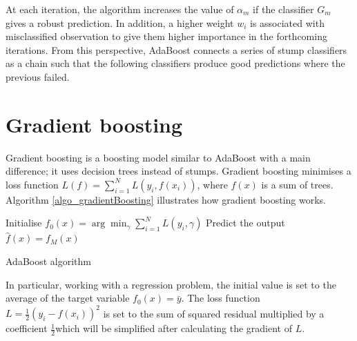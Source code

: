At each iteration, the algorithm increases the value of $\alpha_m$ if the classifier $G_m$ gives a robust prediction. In addition, a higher weight $w_i$ is associated with misclassified observation to give them higher importance in the forthcoming iterations. From this perspective, AdaBoost connects a series of stump classifiers as a chain such that the following classifiers produce good predictions where the previous failed.

\section{Gradient boosting}
Gradient boosting is a boosting model similar to AdaBoost with a main difference; it uses decision trees instead of stumps. Gradient boosting minimises a loss function $L\left(f\right)=\sum_{i=1}^{N}L\left(y_i,f\left(x_i\right)\right)$,  where $f(x)$ is a sum of trees. Algorithm \ref{algo_gradientBoosting} illustrates how gradient boosting works.


\begin{algorithm}[H]
\DontPrintSemicolon
\SetAlgoLined

    Initialise $f_0\left(x\right)=\arg{\min_\gamma{\sum_{i=1}^{N}L\left(y_i,\gamma\right)}}$ \;
    Predict the output $\hat{f}\left(x\right)=f_M(x)$ \; 

\caption{AdaBoost algorithm}
\label{algo_gradientBoosting}
\end{algorithm}

In particular, working with a regression problem, the initial value is set to the average of the target variable $f_0\left(x\right)=\bar{y}$. The loss function $L=\frac{1}{2}\left(y_i-f\left(x_i\right)\right)^2$ is set to the sum of squared residual multiplied by a coefficient $\frac{1}{2} $which will be simplified after calculating the gradient of $L$. \par


